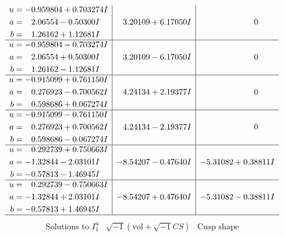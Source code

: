 \documentclass[1p]{elsarticle_modified}
\theoremstyle{definition}
\newcommand{\I}{\sqrt{-1}}
\begin{document}
$$\begin{array}{c|c|c}
\begin{aligned}
u &= -0.959804 + 0.703274 I \\
a &= \phantom{-}2.06554 - 0.50300 I \\
b &= \phantom{-}1.26162 + 1.12681 I\end{aligned}
 & \phantom{-}3.20109 + 6.17050 I & \phantom{-0.000000 } 0 \\ \hline\begin{aligned}
u &= -0.959804 - 0.703274 I \\
a &= \phantom{-}2.06554 + 0.50300 I \\
b &= \phantom{-}1.26162 - 1.12681 I\end{aligned}
 & \phantom{-}3.20109 - 6.17050 I & \phantom{-0.000000 } 0 \\ \hline\begin{aligned}
u &= -0.915099 + 0.761150 I \\
a &= \phantom{-}0.276923 - 0.700562 I \\
b &= \phantom{-}0.598686 + 0.067274 I\end{aligned}
 & \phantom{-}4.24134 + 2.19377 I & \phantom{-0.000000 } 0 \\ \hline\begin{aligned}
u &= -0.915099 - 0.761150 I \\
a &= \phantom{-}0.276923 + 0.700562 I \\
b &= \phantom{-}0.598686 - 0.067274 I\end{aligned}
 & \phantom{-}4.24134 - 2.19377 I & \phantom{-0.000000 } 0 \\ \hline\begin{aligned}
u &= \phantom{-}0.292739 + 0.750663 I \\
a &= -1.32844 - 2.03101 I \\
b &= -0.57813 - 1.46945 I\end{aligned}
 & -8.54207 - 0.47640 I & -5.31082 + 0.38811 I \\ \hline\begin{aligned}
u &= \phantom{-}0.292739 - 0.750663 I \\
a &= -1.32844 + 2.03101 I \\
b &= -0.57813 + 1.46945 I\end{aligned}
 & -8.54207 + 0.47640 I & -5.31082 - 0.38811 I\\
 \hline 
 \end{array}$$\newpage$$\begin{array}{c|c|c}  
\text{Solutions to }I^u_{1}& \I (\text{vol} + \sqrt{-1}CS) & \text{Cusp shape}\\
 \hline 
\begin{aligned}

\end{aligned}
\end{array}$$
\end{document}

